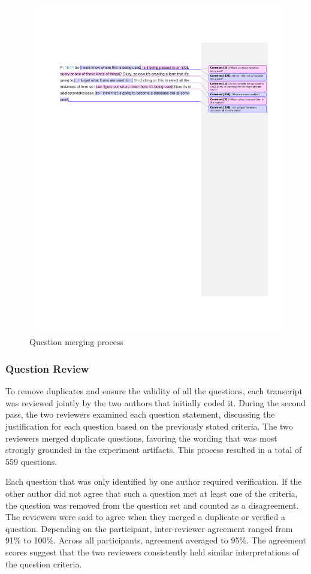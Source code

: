 \documentclass[conference]{IEEEtran}
\begin{document}
\begin{figure}
\centering
\includegraphics[width=7.5in]{Images/QuestionMerging}
\caption{Question merging process}
\label{fig:merging} 
\end{figure}

\subsubsection{Question Review}
To remove duplicates and ensure the validity of all the questions, each transcript was reviewed jointly by the two authors that initially coded it.
During the second pass, the two reviewers examined each question statement, discussing the justification for each question based on the previously stated criteria.
The two reviewers merged duplicate questions, favoring the wording that was most strongly grounded in the experiment artifacts.
This process resulted in a total of 559 questions.

Each question that was only identified by one author required verification.
If the other author did not agree that such a question met at least one of the criteria, the question was removed from the question set and counted as a disagreement.
The reviewers were said to agree when they merged a duplicate or verified a question. Depending on the participant, inter-reviewer agreement ranged from 91\% to 100\%. Across all participants, agreement averaged to 95\%.
The agreement scores suggest that the two reviewers consistently held similar interpretations of the question criteria.
\end{document}
